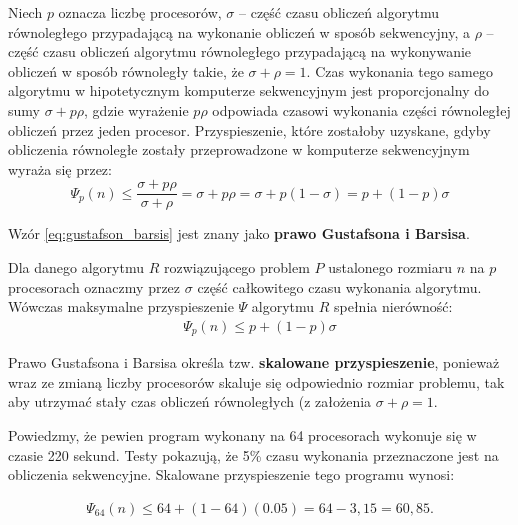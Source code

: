 Niech \(p\) oznacza liczbę procesorów, \(\sigma\) -- część czasu obliczeń algorytmu równoległego przypadającą na wykonanie obliczeń w sposób sekwencyjny, a \(\rho\) -- część czasu obliczeń algorytmu równoległego przypadającą na wykonywanie obliczeń w sposób równoległy takie, że \(\sigma+\rho=1\). Czas wykonania tego samego algorytmu w hipotetycznym komputerze sekwencyjnym jest proporcjonalny do sumy \(\sigma + p\rho\), gdzie wyrażenie \(p\rho\) odpowiada czasowi wykonania części równoległej obliczeń przez jeden procesor. Przyspieszenie, które zostałoby uzyskane, gdyby obliczenia równoległe zostały przeprowadzone w komputerze sekwencyjnym wyraża się przez:
\begin{equation}\label{eq:gustafson_barsis}
\Psi_{p}(n)\leq\frac{\sigma+p\rho}{\sigma+\rho}=\sigma+p\rho=\sigma+p\left(1-\sigma\right)=p+\left(1-p\right)\sigma
\end{equation}

Wzór \eqref{eq:gustafson_barsis} jest znany jako \textbf{prawo Gustafsona i	Barsisa}. 

\begin{definicja}
Dla danego algorytmu \(R\) rozwiązującego problem \(P\) ustalonego rozmiaru \(n\) na \(p\) procesorach oznaczmy przez \(\sigma\) część całkowitego czasu wykonania algorytmu. Wówczas maksymalne przyspieszenie \(\Psi\) algorytmu \(R\) spełnia nierówność:
\begin{align*}
\Psi_{p}(n) \leq p + (1-p)\sigma
\end{align*}
\end{definicja}
\begin{uwaga}
Prawo Gustafsona i Barsisa określa tzw. \textbf{skalowane przyspieszenie}, ponieważ wraz ze zmianą liczby procesorów skaluje się odpowiednio rozmiar problemu, tak aby utrzymać stały czas obliczeń równoległych (z założenia \(\sigma + \rho = 1\)\cite{Czech}.
\end{uwaga}

\begin{przyklad}
Powiedzmy, że pewien program wykonany na 64 procesorach wykonuje się w czasie 220 sekund. Testy pokazują, że 5\% czasu wykonania przeznaczone jest na obliczenia sekwencyjne. Skalowane przyspieszenie tego programu wynosi:

\begin{align*}
\Psi_{64}(n) \leq 64 + (1-64)(0.05) = 64 - 3,15 = 60,85.
\end{align*}
\end{przyklad}